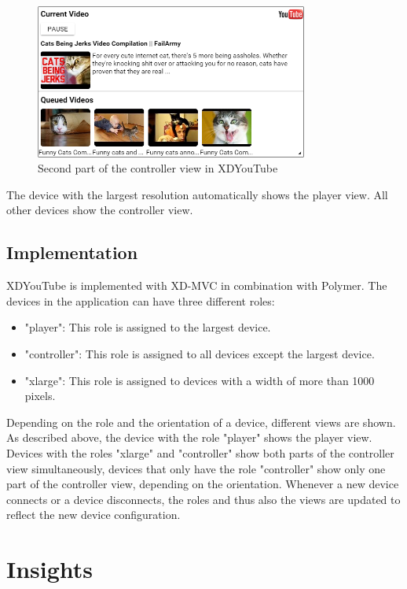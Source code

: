 \begin{figure}[H]
  \centering
    \includegraphics[width=0.8\textwidth]{images/screenshots/xdyt/controller_landscape.png}
	\caption[Screenshot XDYouTube: Controller view (second part)]{Second part of the controller view in XDYouTube}
	\label{fig:xdyt_controller_landscape}
\end{figure}

The device with the largest resolution automatically shows the player view. All other devices show the controller view. 

\subsection{Implementation}

XDYouTube is implemented with XD-MVC in combination with Polymer. The devices in the application can have three different roles:
\begin{itemize}
	\item "player": This role is assigned to the largest device.
	\item "controller": This role is assigned to all devices except the largest device.
	\item "xlarge": This role is assigned to devices with a width of more than 1000 pixels.
\end{itemize}
Depending on the role and the orientation of a device, different views are shown. As described above, the device with the role "player" shows the player view. Devices with the roles "xlarge" and "controller" show both parts of the controller view simultaneously, devices that only have the role "controller" show only one part of the controller view, depending on the orientation. Whenever a new device connects or a device disconnects, the roles and thus also the views are updated to reflect the new device configuration.

\section{Insights}

